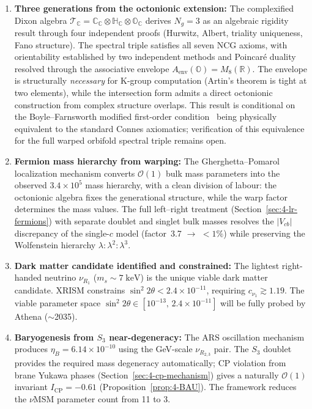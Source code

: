 \begin{enumerate}
  \item \textbf{Three generations from the octonionic extension:} The complexified Dixon algebra $\mathcal{T}_{\mathbb{C}} = \mathbb{C}_{\mathbb{C}} \otimes \mathbb{H}_{\mathbb{C}} \otimes \mathbb{O}_{\mathbb{C}}$ derives $N_g = 3$ as an algebraic rigidity result through four independent proofs (Hurwitz, Albert, triality uniqueness, Fano structure). The spectral triple satisfies all seven NCG axioms, with orientability established by two independent methods and Poincar\'{e} duality resolved through the associative envelope $A_{\mathrm{env}}(\mathbb{O}) = M_8(\mathbb{R})$.  The envelope is structurally \emph{necessary} for K-group computation (Artin's theorem is tight at two elements), while the intersection form admits a direct octonionic construction from complex structure overlaps.  This result is conditional on the Boyle--Farnsworth modified first-order condition~\cite{ch4:BoyleFarnsworth2020} being physically equivalent to the standard Connes axiomatics; verification of this equivalence for the full warped orbifold spectral triple remains open.

  \item \textbf{Fermion mass hierarchy from warping:} The Gherghetta--Pomarol localization mechanism converts $\mathcal{O}(1)$ bulk mass parameters into the observed $3.4 \times 10^5$ mass hierarchy, with a clean division of labour: the octonionic algebra fixes the generational structure, while the warp factor determines the mass values.  The full left--right treatment (Section~\ref{sec:4-lr-fermions}) with separate doublet and singlet bulk masses resolves the $|V_{cb}|$ discrepancy of the single-$c$ model (factor~3.7 $\to$ $< 1\%$) while preserving the Wolfenstein hierarchy $\lambda : \lambda^2 : \lambda^3$.

  \item \textbf{Dark matter candidate identified and constrained:} The lightest right-handed neutrino $\nu_{R_1}$ ($m_s \sim 7\;\mathrm{keV}$) is the unique viable dark matter candidate. XRISM constrains $\sin^2 2\theta < 2.4 \times 10^{-11}$, requiring $c_{\nu_1} \gtrsim 1.19$. The viable parameter space $\sin^2 2\theta \in [10^{-13},\, 2.4 \times 10^{-11}]$ will be fully probed by Athena ($\sim$2035).

  \item \textbf{Baryogenesis from $S_3$ near-degeneracy:} The ARS oscillation mechanism produces $\eta_B = 6.14 \times 10^{-10}$ using the GeV-scale $\nu_{R_{2,3}}$ pair. The $S_3$ doublet provides the required mass degeneracy automatically; CP violation from brane Yukawa phases (Section~\ref{sec:4-cp-mechanism}) gives a naturally $\mathcal{O}(1)$ invariant $I_{\mathrm{CP}} = -0.61$ (Proposition~\ref{prop:4-BAU}). The framework reduces the $\nu$MSM parameter count from 11 to 3.


\end{enumerate}
